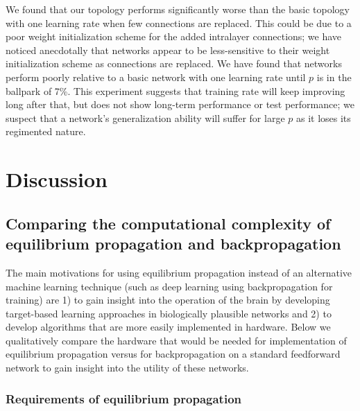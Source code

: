 \documentclass[utf8]{frontiersSCNS}
\begin{document}
We found that our topology performs significantly worse than the basic topology with one learning rate when few connections are replaced. This could be due to a poor weight initialization scheme for the added intralayer connections; we have noticed anecdotally that networks appear to be less-sensitive to their weight initialization scheme as connections are replaced. We have found that networks perform poorly relative to a basic network with one learning rate until $p$ is in the ballpark of 7\%. This experiment suggests that training rate will keep improving long after that, but does not show long-term performance or test performance; we suspect that a network's generalization ability will suffer for large $p$ as it loses its regimented nature.

\section{Discussion}

\subsection{Comparing the computational complexity of equilibrium propagation and backpropagation}
\label{sec:comparison}
The main motivations for using equilibrium propagation instead of an alternative 
machine learning technique (such as deep learning using backpropagation for training) are 1) to 
gain insight into the operation of the brain by developing target-based learning approaches in 
biologically plausible networks and 2) to develop algorithms that are more easily implemented in 
hardware. Below we qualitatively compare the hardware that would be needed for implementation of 
equilibrium propagation versus for backpropagation on a standard feedforward network to gain 
insight into the utility of these networks.

\subsubsection{Requirements of equilibrium propagation}
\end{document}
